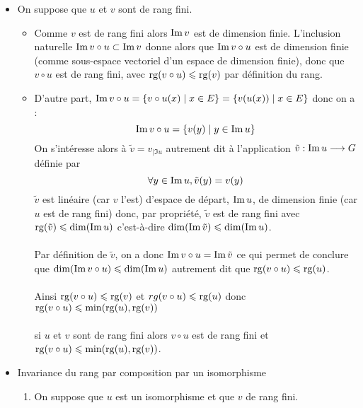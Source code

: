 \begin{dem}
    \begin{itemize}
        \item On suppose que \(u\) et \(v\) sont de rang fini.\\
        \begin{itemize}
            \item Comme \(v\) est de rang fini alors \(\operatorname{Im} v\) est de dimension finie. L’inclusion naturelle \(\operatorname{Im} v\circ u \subset \operatorname{Im} v\) donne alors que \(\operatorname{Im} v \circ u\) est de dimension finie (comme sous-espace vectoriel d’un espace de dimension finie), donc que \(v \circ u\) est de rang fini, avec \(\operatorname{rg} (v \circ u) \leqslant \operatorname{rg} (v)\) par définition du rang.
            \item D’autre part, \(\operatorname{Im} v \circ u = \left\lbrace v \circ u(x) \;\middle|\; x \in  E\right\rbrace = \left\lbrace v (u(x)) \;\middle|\; x \in  E\right\rbrace\) donc on a :
                \[\operatorname{Im} v \circ u = \left\lbrace v(y) \;\middle|\; y \in  \operatorname{Im} u\right\rbrace\]
            On s’intéresse alors à \(\tilde{v} = v_{| \Im u}\) autrement dit à l’application \(\tilde{v} : \operatorname{Im} u \longrightarrow G\) définie par
                \[\forall y \in  \operatorname{Im} u, \tilde{v}(y) = v(y)\]
            \(\tilde{v}\) est linéaire (car \(v\) l’est) d’espace de départ, \(\operatorname{Im} u\), de dimension finie (car \(u\) est de rang fini) donc, par propriété, \(\tilde{v}\) est de rang fini avec \(\operatorname{rg} (\tilde{v}) \leqslant \dim (\operatorname{Im} u)\) c’est-à-dire \(\dim (\operatorname{Im} \tilde{v}) \leqslant \dim (\operatorname{Im} u)\).\\~\\
            Par définition de \(\tilde{v}\), on a donc \(\operatorname{Im} v \circ u = \operatorname{Im} \tilde{v}\) ce qui permet de conclure que \(\dim (\operatorname{Im} v \circ u) \leqslant \dim (\operatorname{Im} u)\) autrement dit que \(\operatorname{rg} (v\circ u) \leqslant \operatorname{rg} (u) \).\\~\\
            Ainsi \(\operatorname{rg} (v \circ u) \leqslant \operatorname{rg} (v)\) et \(rg (v \circ u) \leqslant \operatorname{rg} (u)\) donc \(\operatorname{rg} (v \circ u) \leqslant \min (\operatorname{rg} (u) , \operatorname{rg} (v))\)\\~\\
            \conclusion si \(u\) et \(v\) sont de rang fini alors \(v \circ u\) est de rang fini et \(\operatorname{rg} (v \circ u) \leqslant \min(\operatorname{rg}(u), \operatorname{rg}(v))\).
        \end{itemize}
        \item Invariance du rang par composition par un isomorphisme
        \begin{enumerate}
            \item On suppose que \(u\) est un isomorphisme et que \(v\) de rang fini. \\

\end{enumerate}
\end{itemize}
\end{dem}
